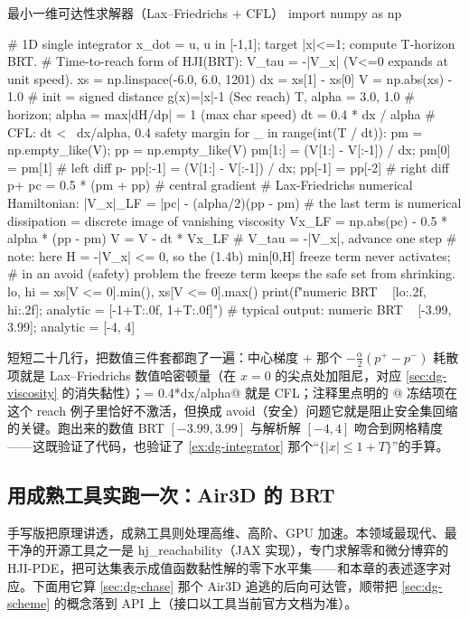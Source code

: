 \begin{codebox}[Python]{最小一维可达性求解器（Lax--Friedrichs + CFL）}
import numpy as np

# 1D single integrator x_dot = u, u in [-1,1]; target {|x|<=1}; compute T-horizon BRT.
# Time-to-reach form of HJI(BRT): V_tau = -|V_x|  ({V<=0} expands at unit speed).
xs = np.linspace(-6.0, 6.0, 1201)
dx = xs[1] - xs[0]
V  = np.abs(xs) - 1.0                  # init = signed distance g(x)=|x|-1 (Sec reach)
T, alpha = 3.0, 1.0                    # horizon; alpha = max|dH/dp| = 1 (max char speed)
dt = 0.4 * dx / alpha                  # CFL: dt <~ dx/alpha, 0.4 safety margin
for _ in range(int(T / dt)):
    pm = np.empty_like(V); pp = np.empty_like(V)
    pm[1:]  = (V[1:] - V[:-1]) / dx; pm[0]  = pm[1]     # left diff p-
    pp[:-1] = (V[1:] - V[:-1]) / dx; pp[-1] = pp[-2]    # right diff p+
    pc = 0.5 * (pm + pp)                                # central gradient
    # Lax-Friedrichs numerical Hamiltonian: |V_x|_LF = |pc| - (alpha/2)(pp - pm)
    #   the last term is numerical dissipation = discrete image of vanishing viscosity
    Vx_LF = np.abs(pc) - 0.5 * alpha * (pp - pm)
    V = V - dt * Vx_LF                                  # V_tau = -|V_x|, advance one step
    # note: here H = -|V_x| <= 0, so the (1.4b) min[0,H] freeze term never activates;
    #       in an avoid (safety) problem the freeze term keeps the safe set from shrinking.
lo, hi = xs[V <= 0].min(), xs[V <= 0].max()
print(f"numeric BRT ~ [{lo:.2f}, {hi:.2f}]; analytic = [-{1+T:.0f}, {1+T:.0f}]")
# typical output: numeric BRT ~ [-3.99, 3.99]; analytic = [-4, 4]
\end{codebox}

短短二十几行，把数值三件套都跑了一遍：中心梯度 + 那个 $-\tfrac{\alpha}{2}(p^+-p^-)$ 耗散项就是 Lax--Friedrichs 数值哈密顿量（在 $x=0$ 的尖点处加阻尼，对应 \cref{sec:dg-viscosity} 的消失黏性）；\verb@dt = 0.4*dx/alpha@ 就是 CFL；注释里点明的 \verb@min[0,H]@ 冻结项在这个 reach 例子里恰好不激活，但换成 avoid（安全）问题它就是阻止安全集回缩的关键。跑出来的数值 BRT $[-3.99,3.99]$ 与解析解 $[-4,4]$ 吻合到网格精度——这既验证了代码，也验证了 \cref{ex:dg-integrator} 那个“$\{|x|\le1+T\}$”的手算。

\subsection{用成熟工具实跑一次：Air3D 的 BRT}
\label{sec:dg-tool}
手写版把原理讲透，成熟工具则处理高维、高阶、GPU 加速。本领域最现代、最干净的开源工具之一是 hj\_reachability（JAX 实现），专门求解零和微分博弈的 HJI-PDE，把可达集表示成值函数黏性解的零下水平集——和本章的表述逐字对应。下面用它算 \cref{sec:dg-chase} 那个 Air3D 追逃的后向可达管，顺带把 \cref{sec:dg-scheme} 的概念落到 API 上（接口以工具当前官方文档为准）。

